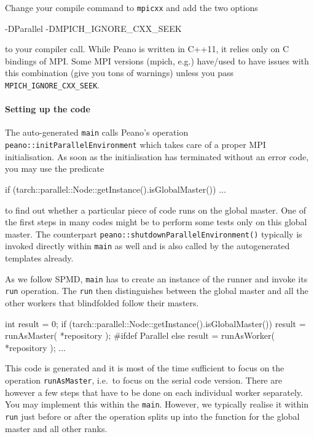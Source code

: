 Change your compile command to \texttt{mpicxx} and add the two options
\begin{code}
  -DParallel -DMPICH_IGNORE_CXX_SEEK
\end{code}
to your compiler call.
While Peano is written in C++11, it relies only on C bindings of MPI.
Some MPI versions (mpich, e.g.) have/used to have issues with this combination
(give you tons of warnings) unless you pass \texttt{MPICH\_IGNORE\_CXX\_SEEK}. 


\paragraph{Setting up the code}

The auto-generated \texttt{main} calls Peano's operation \newline
\texttt{peano::initParallelEnvironment} which takes care of a proper MPI
initialisation. 
As soon as the initialisation has terminated without an error code, you may use
the predicate

\begin{code}
if (tarch::parallel::Node::getInstance().isGlobalMaster()) {
  ...
}
\end{code}

\noindent
to find out whether a particular piece of code runs on the global master. 
One of the first steps in many codes might be to perform some tests only on this
global master.
The counterpart \texttt{peano::shutdownParallelEnvironment()} typically is
invoked directly within \texttt{main} as well and is also called by the
autogenerated templates already.

As we follow SPMD, \texttt{main} has to create an instance of the runner and
invoke its \texttt{run} operation. 
The \texttt{run} then distinguishes between the global master and all the other
workers that blindfolded follow their masters. 
\begin{code}
  int result = 0;
  if (tarch::parallel::Node::getInstance().isGlobalMaster()) {
    result = runAsMaster( *repository );
  }
  #ifdef Parallel
  else {
    result = runAsWorker( *repository );
  }
  ...
\end{code}

\noindent
This code is generated and it is most of the time sufficient to focus on the
operation \texttt{runAsMaster}, i.e.~to focus on the serial code version. There
are however a few steps that have to be done on each individual worker
separately. 
You may implement this within the \texttt{main}.
However, we typically realise it within \texttt{run} just before or after the
operation splits up into the function for the global master and all other ranks.


